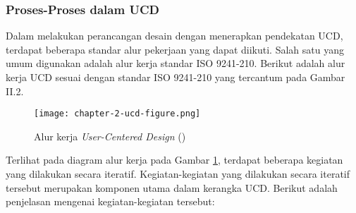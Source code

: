 \subsubsection{Proses-Proses dalam UCD}

Dalam melakukan perancangan desain dengan menerapkan pendekatan UCD, terdapat beberapa standar alur pekerjaan yang dapat diikuti. Salah satu yang umum digunakan adalah alur kerja standar ISO 9241-210. Berikut adalah alur kerja UCD sesuai dengan standar ISO 9241-210 yang tercantum pada Gambar II.2.

\begin{figure}[h]
  \centering
  \texttt{[image: chapter-2-ucd-figure.png]}
  \caption{Alur kerja \textit{User-Centered Design} (\parencite{iso9241-210:2010})}
  \label{fig:diagram_iso2}
\end{figure}

Terlihat pada diagram alur kerja pada Gambar \ref{fig:diagram_iso2}, terdapat beberapa kegiatan yang dilakukan secara iteratif. Kegiatan-kegiatan yang dilakukan secara iteratif tersebut merupakan komponen utama dalam kerangka UCD. Berikut adalah penjelasan mengenai kegiatan-kegiatan tersebut:

